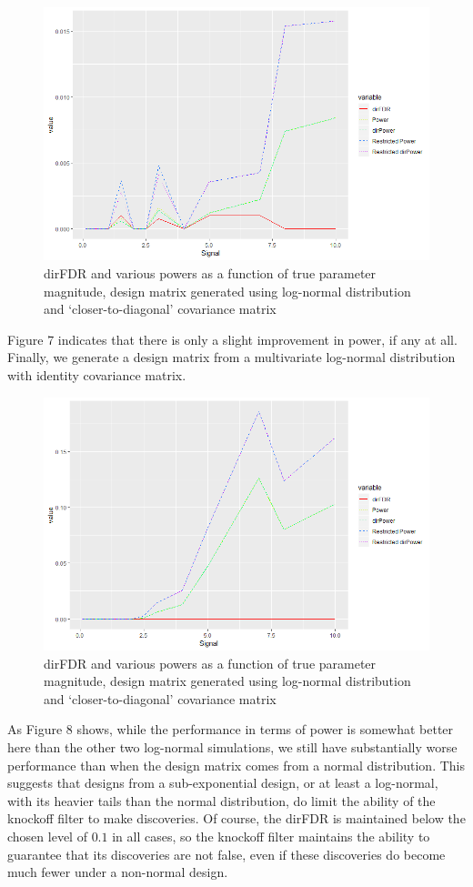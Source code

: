 \documentclass[]{scrartcl}
\newcommand{\1}[1]{\mathbbm{1}_{\left\{#1\right\}}}
\begin{document}
 \begin{figure}[h!]
 	\centering
 	\includegraphics[width=\textwidth]{results_lgnrm2}
 	\caption{dirFDR and various powers as a function of true parameter magnitude, design matrix generated using log-normal distribution and `closer-to-diagonal' covariance matrix}
 \end{figure}
Figure 7 indicates that there is only a slight improvement in power, if any at all. Finally, we generate a design matrix from a multivariate log-normal distribution with identity covariance matrix. 
 \begin{figure}[h!]
	\centering
	\includegraphics[width=\textwidth]{results_lgnrm3}
	\caption{dirFDR and various powers as a function of true parameter magnitude, design matrix generated using log-normal distribution and `closer-to-diagonal' covariance matrix}
\end{figure}
As Figure 8 shows, while the performance in terms of power is somewhat better here than the other two log-normal simulations, we still have substantially worse performance than when the design matrix comes from a normal distribution. This suggests that designs from a sub-exponential design, or at least a log-normal, with its heavier tails than the normal distribution, do limit the ability of the knockoff filter to make discoveries. Of course, the dirFDR is maintained below the chosen level of $0.1$ in all cases, so the knockoff filter maintains the ability to guarantee that its discoveries are not false, even if these discoveries do become much fewer under a non-normal design.
\end{document}
